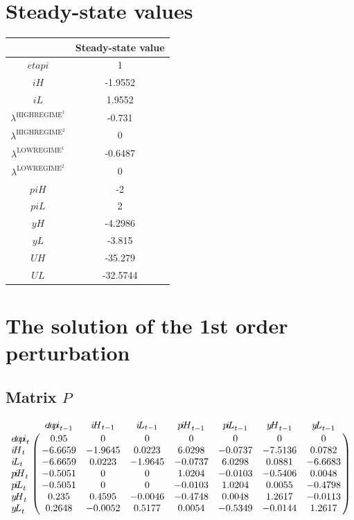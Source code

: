

\section{Steady-state values}


\begin{tabular}{c|c|}
  & Steady-state value\\
\hline
${e\!t\!a\!p\!i}$ & 1 \\
${i\!H}$ & -1.9552 \\
${i\!L}$ & 1.9552 \\
$\lambda^{\mathrm{HIGHREGIME}^{\mathrm{1}}}$ & -0.731 \\
$\lambda^{\mathrm{HIGHREGIME}^{\mathrm{2}}}$ & 0 \\
$\lambda^{\mathrm{LOWREGIME}^{\mathrm{1}}}$ & -0.6487 \\
$\lambda^{\mathrm{LOWREGIME}^{\mathrm{2}}}$ & 0 \\
${p\!i\!H}$ & -2 \\
${p\!i\!L}$ & 2 \\
${y\!H}$ & -4.2986 \\
${y\!L}$ & -3.815 \\
${U\!H}$ & -35.279 \\
${U\!L}$ & -32.5744 \\
\hline
\end{tabular}


\section{The solution of the 1st order perturbation}

\subsection*{Matrix $P$}

$$\bordermatrix{
~ & {e\!t\!a\!p\!i}_{t-1} & {i\!H}_{t-1} & {i\!L}_{t-1} & {p\!i\!H}_{t-1} & {p\!i\!L}_{t-1} & {y\!H}_{t-1} & {y\!L}_{t-1} \cr
{e\!t\!a\!p\!i}_{t} & 0.95 & 0 & 0 & 0 & 0 & 0 & 0 \cr
{i\!H}_{t} & -6.6659 & -1.9645 & 0.0223 & 6.0298 & -0.0737 & -7.5136 & 0.0782 \cr
{i\!L}_{t} & -6.6659 & 0.0223 & -1.9645 & -0.0737 & 6.0298 & 0.0881 & -6.6683 \cr
{p\!i\!H}_{t} & -0.5051 & 0 & 0 & 1.0204 & -0.0103 & -0.5406 & 0.0048 \cr
{p\!i\!L}_{t} & -0.5051 & 0 & 0 & -0.0103 & 1.0204 & 0.0055 & -0.4798 \cr
{y\!H}_{t} & 0.235 & 0.4595 & -0.0046 & -0.4748 & 0.0048 & 1.2617 & -0.0113 \cr
{y\!L}_{t} & 0.2648 & -0.0052 & 0.5177 & 0.0054 & -0.5349 & -0.0144 & 1.2617 \cr
}$$

